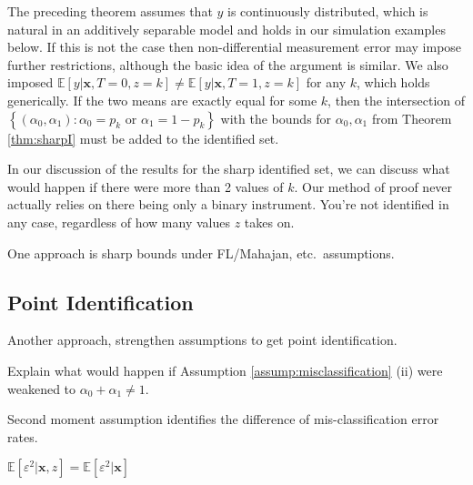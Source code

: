 The preceding theorem assumes that $y$ is continuously distributed, which is natural in an additively separable model and holds in our simulation examples below. 
If this is not the case then non-differential measurement error may impose further restrictions, although the basic idea of the argument is similar.
We also imposed $\mathbb{E}[y|\mathbf{x},T = 0, z=k] \neq \mathbb{E}[y|\mathbf{x},T=1, z=k]$ for any $k$, which holds generically.
If the two means are exactly equal for some $k$, then the intersection of $\left\{ (\alpha_0, \alpha_1)\colon \alpha_0 = p_k \mbox{ or } \alpha_1 = 1-p_k \right\}$ with the bounds for $\alpha_0, \alpha_1$ from Theorem \ref{thm:sharpI} must be added to the identified set.

In our discussion of the results for the sharp identified set, we can discuss what would happen if there were more than 2 values of $k$.
Our method of proof never actually relies on there being only a binary instrument. 
You're not identified in any case, regardless of how many values $z$ takes on.





One approach is sharp bounds under FL/Mahajan, etc.\ assumptions.

\subsection{Point Identification}
Another approach, strengthen assumptions to get point identification.

Explain what would happen if Assumption \ref{assump:misclassification} (ii) were weakened to $\alpha_0 + \alpha_1 \neq 1$.

\noindent Second moment assumption identifies the difference of mis-classification error rates.
\begin{assump} \mbox{}
  \label{assump:2ndMoment}
    $\mathbb{E}[\varepsilon^2|\mathbf{x},z] = \mathbb{E}[\varepsilon^2|\mathbf{x}]$ 
\end{assump}

